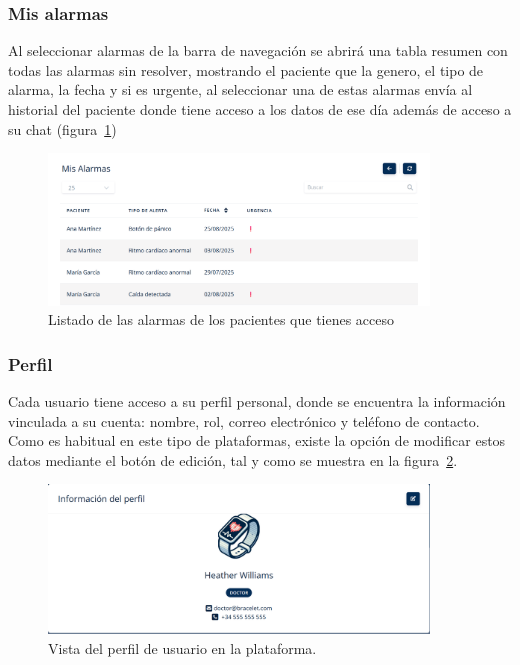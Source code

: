 \documentclass[12pt, a4paper]{article}
\begin{document}
\begin{umaappendices}
	\subsubsection{Mis alarmas}
	Al seleccionar alarmas de la barra de navegación se abrirá una tabla resumen con todas las alarmas sin resolver, mostrando el paciente que la genero, el tipo de alarma, la fecha y si es urgente, al seleccionar una de estas alarmas envía al historial del paciente donde tiene acceso a los datos de ese día además de acceso a su chat (figura~\ref{fig:alarn})
	
	\begin{figure}[htbp]
		\centering
		\includegraphics[width=0.9\textwidth]{images/12_alarmas.png}
		\caption[Ejemplo]{Listado de las alarmas de los pacientes que tienes acceso}
		\label{fig:alarn}
	\end{figure}

	
	\subsubsection{Perfil}
	Cada usuario tiene acceso a su perfil personal, donde se encuentra la información vinculada a su cuenta: nombre, rol, correo electrónico y teléfono de contacto. Como es habitual en este tipo de plataformas, existe la opción de modificar estos datos mediante el botón de edición, tal y como se muestra en la figura~\ref{fig:per}.
	
	\begin{figure}[htbp]
		\centering
		\includegraphics[width=0.9\textwidth]{images/13_perfil.png}
		\caption[Ejemplo]{Vista del perfil de usuario en la plataforma.}
		\label{fig:per}
	\end{figure}
	

\end{umaappendices}
\end{document}
